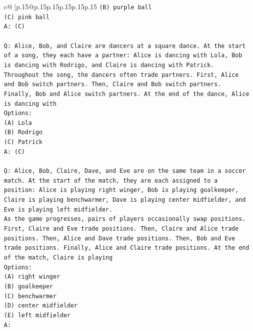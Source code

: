 \documentclass{article}
\begin{document}
{\begin{supertabular}{c@{$\;$}|p{.15\linewidth}@{}p{.15\linewidth}p{.15\linewidth}p{.15\linewidth}p{.15\linewidth}p{.15\linewidth}}
{{{\texttt{(B) purple ball} \\
\texttt{(C) pink ball} \\
\texttt{A: (C)} \\
\\ 
\texttt{Q: Alice, Bob, and Claire are dancers at a square dance. At the start of a song, they each have a partner: Alice is dancing with Lola, Bob is dancing with Rodrigo, and Claire is dancing with Patrick.} \\
\texttt{Throughout the song, the dancers often trade partners. First, Alice and Bob switch partners. Then, Claire and Bob switch partners. Finally, Bob and Alice switch partners. At the end of the dance, Alice is dancing with} \\
\texttt{Options:} \\
\texttt{(A) Lola} \\
\texttt{(B) Rodrigo} \\
\texttt{(C) Patrick} \\
\texttt{A: (C)} \\
\\ 
\texttt{Q: Alice, Bob, Claire, Dave, and Eve are on the same team in a soccer match. At the start of the match, they are each assigned to a position: Alice is playing right winger, Bob is playing goalkeeper, Claire is playing benchwarmer, Dave is playing center midfielder, and Eve is playing left midfielder.} \\
\texttt{As the game progresses, pairs of players occasionally swap positions. First, Claire and Eve trade positions. Then, Claire and Alice trade positions. Then, Alice and Dave trade positions. Then, Bob and Eve trade positions. Finally, Alice and Claire trade positions. At the end of the match, Claire is playing} \\
\texttt{Options:} \\
\texttt{(A) right winger} \\
\texttt{(B) goalkeeper} \\
\texttt{(C) benchwarmer} \\
\texttt{(D) center midfielder} \\
\texttt{(E) left midfielder} \\
\texttt{A:} \\
            }
        }
    }
     \\ \\


\end{supertabular}}
\end{document}
